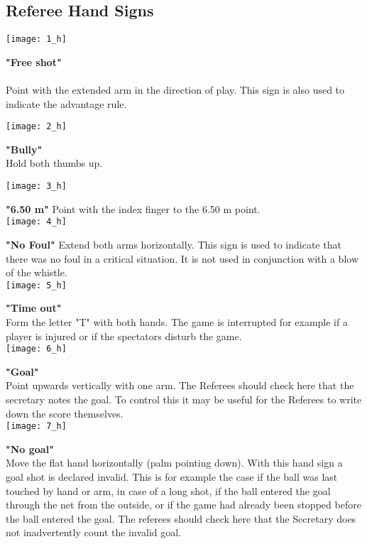 \subsection{Referee Hand Signs}






\texttt{[image: 1\_h]}

\textbf{"Free shot"}\\\\ Point with the extended arm in the direction of play. This sign is also used to indicate the advantage rule.


\texttt{[image: 2\_h]}

\textbf{"Bully"}\\ Hold both thumbs up.  


\texttt{[image: 3\_h]}

\textbf{"6.50 m"} Point with the index finger to the 6.50 m point. \\ 


\texttt{[image: 4\_h]}

 \textbf{"No Foul"} Extend both arms horizontally. This sign is used to indicate that there was no foul in a critical situation. It is not used in conjunction with a blow of the whistle. \\ 


\texttt{[image: 5\_h]}

\textbf{"Time out"}\\ Form the letter "T" with both hands. The game is interrupted for example if a player is injured or if the spectators disturb the game. \\ 


\texttt{[image: 6\_h]}

\textbf{"Goal"}\\ Point upwards vertically with one arm. The Referees should check here that the secretary notes the goal. To control this it may be useful for the Referees to write down the score themselves. \\ 


\texttt{[image: 7\_h]}
 
 \textbf{"No goal"}\\
Move the flat hand horizontally (palm pointing down). With this hand sign a goal shot is declared invalid. This is for example the case if the ball was last touched by hand or arm, in case of a long shot, if the ball entered the goal through the net from the outside, or if the game had already been stopped before the ball entered the goal. The referees should check here that the Secretary does not inadvertently count the invalid goal.\\ 


